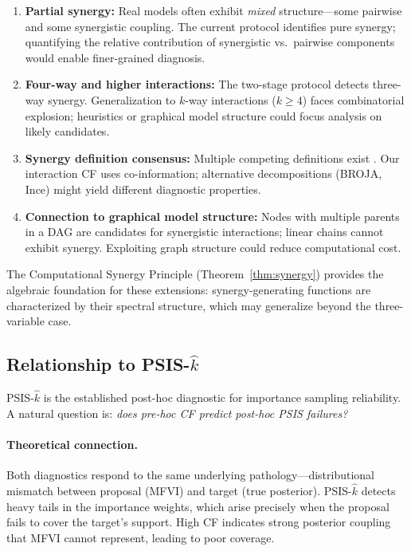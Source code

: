 \documentclass[10pt]{article} %
\theoremstyle{plain}
\theoremstyle{definition}
\begin{document}
\begin{enumerate}
    \item \textbf{Partial synergy:} Real models often exhibit \emph{mixed} structure---some pairwise and some synergistic coupling. The current protocol identifies pure synergy; quantifying the relative contribution of synergistic vs.\ pairwise components would enable finer-grained diagnosis.
    
    \item \textbf{Four-way and higher interactions:} The two-stage protocol detects three-way synergy. Generalization to $k$-way interactions ($k \geq 4$) faces combinatorial explosion; heuristics or graphical model structure could focus analysis on likely candidates.
    
    \item \textbf{Synergy definition consensus:} Multiple competing definitions exist \citep{williams2010nonnegative}. Our interaction CF uses co-information; alternative decompositions (BROJA, Ince) might yield different diagnostic properties.
    
    \item \textbf{Connection to graphical model structure:} Nodes with multiple parents in a DAG are candidates for synergistic interactions; linear chains cannot exhibit synergy. Exploiting graph structure could reduce computational cost.
\end{enumerate}

\noindent The Computational Synergy Principle (Theorem~\ref{thm:synergy}) provides the algebraic foundation for these extensions: synergy-generating functions are characterized by their spectral structure, which may generalize beyond the three-variable case.

\subsection{Relationship to PSIS-$\hat{k}$}

PSIS-$\hat{k}$ \citep{vehtari2017practical} is the established post-hoc diagnostic for importance sampling reliability. A natural question is: \emph{does pre-hoc CF predict post-hoc PSIS failures?}

\paragraph{Theoretical connection.} Both diagnostics respond to the same underlying pathology---distributional mismatch between proposal (MFVI) and target (true posterior). PSIS-$\hat{k}$ detects heavy tails in the importance weights, which arise precisely when the proposal fails to cover the target's support. High CF indicates strong posterior coupling that MFVI cannot represent, leading to poor coverage.
\end{document}
